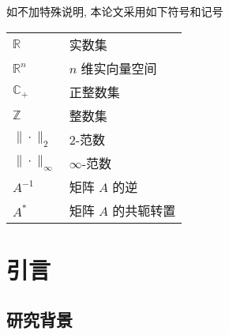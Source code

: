 \documentclass[master]{shnuthesis}
\begin{document}

    \maketoc[pagenumtoc]

	\clearpage  %




\begin{symbolpage}

    如不加特殊说明, 本论文采用如下符号和记号

    \begin{table}[htp!]
    \centering
    \renewcommand\arraystretch{1.5} %
    \begin{tabular}{ll}
    $\mathbb{R}$  & 实数集   \\
    $\mathbb{R}^{n}$  & $n$ 维实向量空间   \\
    $\mathbb{C}_{+}$  & 正整数集  \\
    $\mathbb{Z}$  & 整数集  \\
    $\|\cdot\|_2$  & $2$-范数   \\
    $\|\cdot\|_{\infty}$  & $\infty$-范数   \\
    $A^{-1}$  & 矩阵 $A$ 的逆  \\
    $A^{*}$   & 矩阵 $A$ 的共轭转置
    \end{tabular}
    \end{table}

\end{symbolpage}




    \mainmatter



\chapter{引言}

\section{研究背景}
\end{document}
